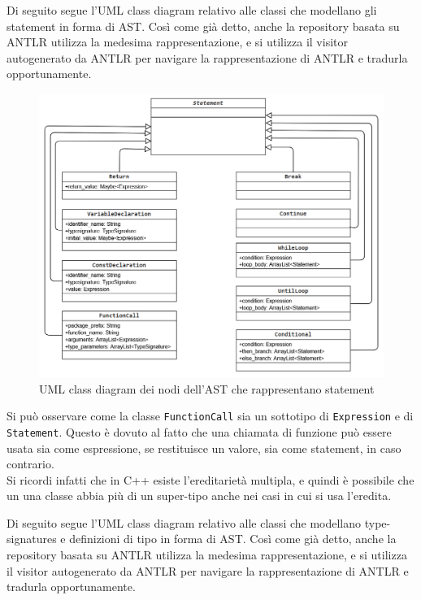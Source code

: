 \newpage

Di seguito segue l'UML class diagram relativo alle classi che modellano 
gli statement in forma di AST. Così come già detto, anche la repository
basata su ANTLR utilizza la medesima rappresentazione, e si utilizza il visitor
autogenerato da ANTLR per navigare la rappresentazione di ANTLR e tradurla opportunamente.

\begin{figure}[H]
    \centering
        \includegraphics[width=1\textwidth]{../../Assets/StatementAST.png}
    \caption{UML class diagram dei nodi dell'AST che rappresentano statement}
\end{figure}

Si può osservare come la classe \texttt{FunctionCall} sia un sottotipo di \texttt{Expression}
e di \texttt{Statement}. Questo è dovuto al fatto che una chiamata di funzione può essere
usata sia come espressione, se restituisce un valore, sia come statement, in caso contrario. \\

Si ricordi infatti che in C++ esiste l'ereditarietà multipla, e quindi è possibile che un
una classe abbia più di un super-tipo anche nei casi in cui si usa l'eredita.

\newpage

Di seguito segue l'UML class diagram relativo alle classi che modellano type-signatures e 
definizioni di tipo in forma di AST. Così come già detto, anche la repository
basata su ANTLR utilizza la medesima rappresentazione, e si utilizza il visitor
autogenerato da ANTLR per navigare la rappresentazione di ANTLR e tradurla opportunamente.

